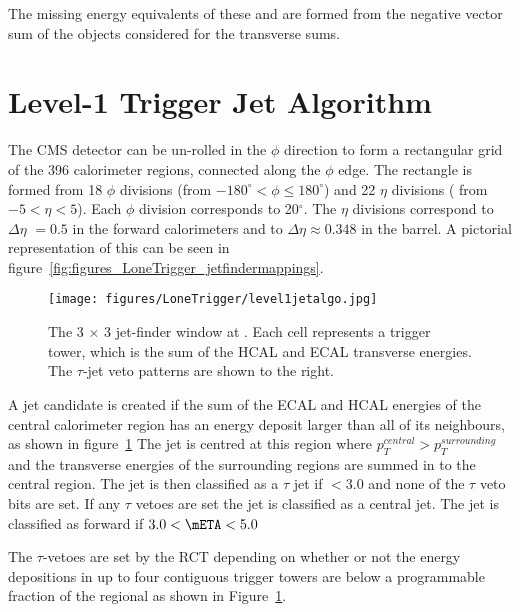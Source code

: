 The missing energy equivalents of these \MET and \MHT are formed from the 
negative vector sum of the objects considered for the
transverse sums.



\section{Level-1 Trigger Jet Algorithm \cite{gctcomm}} %
\label{sec:leve_1_trigger_jet_algorithm}

The CMS detector can be un-rolled in the $\phi$ direction to form a rectangular 
grid of the 396 calorimeter regions, connected along the $\phi$ edge. The
rectangle is formed from 18 $\phi$ divisions (from $-180^{\circ} < \phi \leq 180^{\circ}$) and 22 $\eta$ divisions ( from $-5 < \eta < 5$). Each $\phi$ division corresponds to 20$^{\circ}$. The $\eta$ divisions correspond to $\Delta\eta$ $= 0.5$ in the forward calorimeters and to $\Delta\eta \approx 0.348$ in the barrel. A pictorial representation of this can be seen in 
figure~\ref{fig:figures_LoneTrigger_jetfindermappings}.

\begin{figure}[ht]
  \centering
    \texttt{[image: figures/LoneTrigger/level1jetalgo.jpg]}
  \caption{The 3 $\times$ 3 jet-finder window at \Lone. Each cell represents a 
  trigger tower, which is the sum of the HCAL and ECAL transverse energies. The 
  $\tau$-jet veto patterns are shown to the right.}
  \label{fig:figures_LoneTrigger_level1jetalgo}
\end{figure}


A jet candidate is created if the sum of the ECAL and HCAL energies of the 
central calorimeter region has an energy deposit larger than all of its 
neighbours, as shown in figure~\ref{fig:figures_LoneTrigger_level1jetalgo}
The jet is centred at this region where $p_{T}^{central} > p_{T}^{surrounding}$
and the transverse energies of the surrounding regions are summed in to the 
central region. The jet is then classified as a $\tau$ jet if \mETA $< 3.0$ and 
none of the $\tau$ veto bits are set. If any $\tau$ vetoes are set the jet is 
classified as a central jet. The jet is classified as forward if $ 3.0 < \mETA 
< 5.0$

The $\tau$-vetoes are set by the RCT depending on whether or not the energy 
depositions in up to four contiguous trigger towers are below a programmable 
fraction of the regional \ET as shown in 
Figure~\ref{fig:figures_LoneTrigger_level1jetalgo}.

